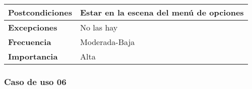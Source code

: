 \begin{longtable}{l|l}
\begin{minipage}{0.25\columnwidth}
\textbf{Postcondiciones} 
\end{minipage}
&
\begin{minipage}{0.65\columnwidth}
Estar en la escena del menú de opciones
\end{minipage}
\\ \hline

\begin{minipage}{0.25\columnwidth}
\textbf{Excepciones} 
\end{minipage}
&
\begin{minipage}{0.65\columnwidth}
No las hay
\end{minipage}
\\ \hline

\begin{minipage}{0.25\columnwidth}
\textbf{Frecuencia} 
\end{minipage}
&
\begin{minipage}{0.65\columnwidth}
Moderada-Baja
\end{minipage}
\\ \hline

\begin{minipage}{0.25\columnwidth}
\textbf{Importancia} 
\end{minipage}
&
\begin{minipage}{0.65\columnwidth}
Alta
\end{minipage}
\\ \hline
\end{longtable}

\subsubsection{Caso de uso 06}

